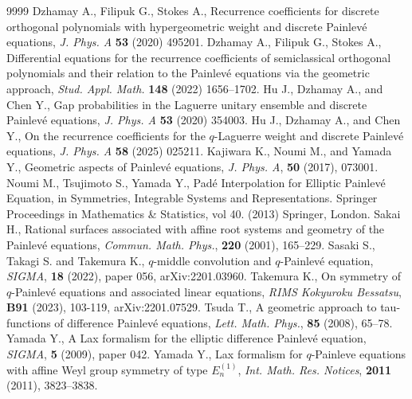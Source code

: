 \documentclass[12pt]{amsart}
\numberwithin{equation}{section}
\theoremstyle{definition}
\begin{document}
\begin{thebibliography}{9999}
 Dzhamay A., Filipuk G., Stokes A., Recurrence coefficients for discrete orthogonal polynomials with hypergeometric weight and discrete Painlev\'e equations, \textit{J. Phys. A} \textbf{53} (2020) 495201.
 Dzhamay A., Filipuk G., Stokes A., Differential equations for the recurrence coefficients of semiclassical orthogonal polynomials and their relation to the Painlev\'e equations via the geometric approach, \textit{Stud. Appl. Math.} \textbf{148} (2022) 1656--1702.
 Hu J., Dzhamay A., and Chen Y., Gap probabilities in the Laguerre unitary ensemble and discrete Painlev\'e equations, \textit{J. Phys. A} \textbf{53} (2020) 354003.
 Hu J., Dzhamay A., and Chen Y., On the recurrence coefficients for the $q$-Laguerre weight and discrete Painlev\'e equations, \textit{J. Phys. A} \textbf{58} (2025) 025211.
 Kajiwara K., Noumi M., and Yamada Y., Geometric aspects of Painlev\'e equations, {\it J. Phys. A}, {\bf 50} (2017), 073001.
Noumi M., Tsujimoto S., Yamada Y., Pad\'e Interpolation for Elliptic Painlev\'e Equation, in Symmetries, Integrable Systems and Representations. Springer Proceedings in Mathematics \& Statistics, vol 40. (2013) Springer, London.
Sakai H., Rational surfaces associated with affine root systems and geometry of the Painlev\'e equations, {\it Commun. Math. Phys.}, {\bf 220} (2001), 165--229.
Sasaki S., Takagi S. and Takemura K., $q$-middle convolution and $q$-Painlev\'e equation, {\sl SIGMA}, {\bf 18} (2022), paper 056, {\sf arXiv:2201.03960}.
Takemura K., On symmetry of $q$-Painlev\'e equations and associated linear equations, {\sl RIMS Kokyuroku Bessatsu}, {\bf B91} (2023), 103-119, {\sf arXiv:2201.07529}.
 Tsuda T., A geometric approach to tau-functions of difference Painlev\'e equations, {\it Lett. Math. Phys.}, {\bf 85} (2008), 65--78.
 Yamada Y., A Lax formalism for the elliptic difference Painlev\'e equation,  {\it SIGMA}, {\bf 5} (2009), paper 042.
 Yamada Y., Lax formalism for $q$-Painleve equations with affine Weyl group symmetry of type $E^{(1)}_n$, {\it Int. Math. Res. Notices}, {\bf 2011} (2011), 3823--3838.
\end{thebibliography}
\end{document}
